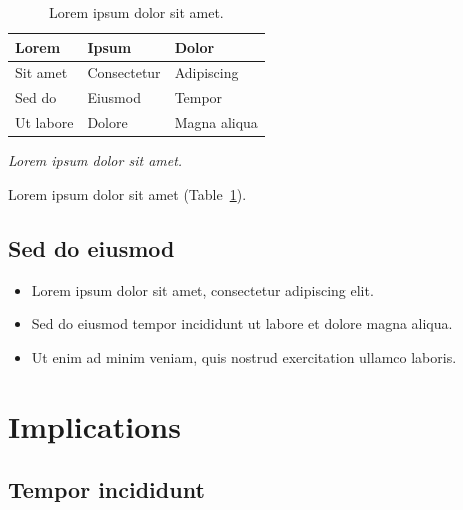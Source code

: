\documentclass[11pt]{article}
\begin{document}
\begin{table}[tbp]
  \centering
  \caption{Lorem ipsum dolor sit amet.}
  \label{tab:example}
  \small
  \begin{tabularx}{\linewidth}{@{}
    >{\raggedright\arraybackslash}X
    >{\raggedright\arraybackslash}X
    >{\raggedright\arraybackslash}X@{}}
    \toprule
    \textbf{Lorem} & \textbf{Ipsum} & \textbf{Dolor} \\
    \midrule
    Sit amet & Consectetur & Adipiscing \\
    Sed do & Eiusmod & Tempor \\
    Ut labore & Dolore & Magna aliqua \\
    \bottomrule
  \end{tabularx}
  \par\smallskip
  {\scriptsize\textit{Lorem ipsum dolor sit amet.}\par}
\end{table}

Lorem ipsum dolor sit amet (Table~\ref{tab:example}).

\subsection{Sed do eiusmod}

\lipsum[6]

\begin{itemize}
  \item Lorem ipsum dolor sit amet, consectetur adipiscing elit.
  \item Sed do eiusmod tempor incididunt ut labore et dolore magna aliqua.
  \item Ut enim ad minim veniam, quis nostrud exercitation ullamco laboris.
\end{itemize}

\section{Implications}

\subsection{Tempor incididunt}
\end{document}
